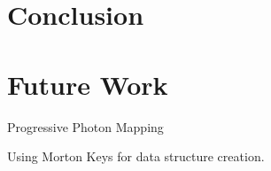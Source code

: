 
\chapter{Conclusion}


\chapter{Future Work}

Progressive Photon Mapping

Using Morton Keys for data structure creation.


